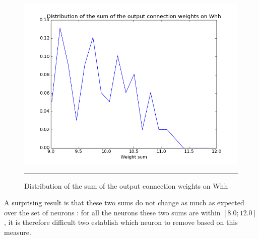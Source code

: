 \begin{figure}[htbp]
    \centering
    \includegraphics[scale=0.4]{Figures/output_sum_weight_distribution.png}
    \rule{35em}{0.5pt}
    \caption[Distribution of the sum of the output connection weights on Whh]{Distribution of the sum of the output connection weights on Whh}
    \label{fig:output_sum}
\end{figure}

A surprising result is that these two sums do not change as much as expected over the set of neurons : for all the neurons these two sums are within $[8.0; 12.0]$, it is therefore difficult two establish which neuron to remove based on this measure.









